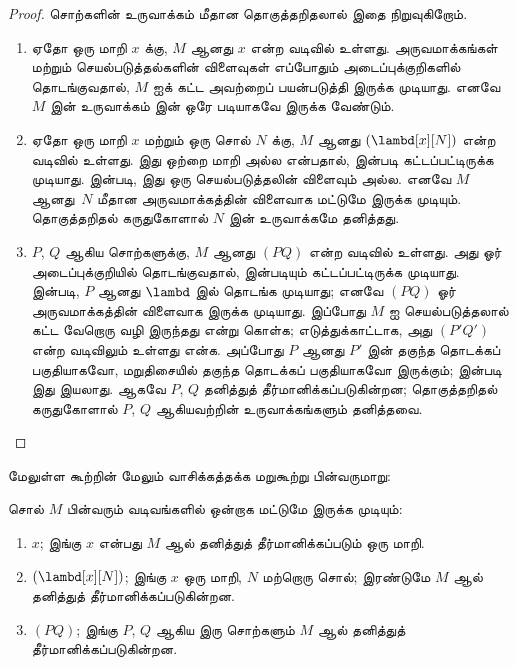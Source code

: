 \documentclass[../../../include/open-logic-section]{subfiles}
\begin{document}
\begin{proof}
  சொற்களின் உருவாக்கம் மீதான தொகுத்தறிதலால் இதை நிறுவுகிறோம்.
  \begin{enumerate}
    \item ஏதோ ஒரு மாறி $x$ க்கு, $M$ ஆனது $x$ என்ற வடிவில் உள்ளது.
      அருவமாக்கங்கள் மற்றும் செயல்படுத்தல்களின் விளைவுகள் எப்போதும்
      அடைப்புக்குறிகளில் தொடங்குவதால், $M$ ஐக் கட்ட அவற்றைப் பயன்படுத்தி
      இருக்க முடியாது. எனவே $M$ இன் உருவாக்கம்
       இன் ஒரே படியாகவே
      இருக்க வேண்டும்.
    \item ஏதோ ஒரு மாறி $x$ மற்றும் ஒரு சொல் $N$ க்கு, $M$ ஆனது
      $(\lambd[x][N])$ என்ற வடிவில் உள்ளது. இது ஒற்றை மாறி அல்ல என்பதால்,
       இன்படி கட்டப்பட்டிருக்க
      முடியாது.  இன்படி, இது ஒரு செயல்படுத்தலின்
      விளைவும் அல்ல. எனவே $M$ ஆனது~$N$ மீதான அருவமாக்கத்தின் விளைவாக மட்டுமே
      இருக்க முடியும். தொகுத்தறிதல் கருதுகோளால் $N$ இன் உருவாக்கமே தனித்தது.
    \item $P$, $Q$ ஆகிய சொற்களுக்கு, $M$ ஆனது $(PQ)$ என்ற வடிவில் உள்ளது.
      அது ஓர் அடைப்புக்குறியில் தொடங்குவதால்,
       இன்படியும் கட்டப்பட்டிருக்க
      முடியாது.  இன்படி, $P$ ஆனது $\lambd$ இல்
      தொடங்க முடியாது; எனவே $(PQ)$ ஓர் அருவமாக்கத்தின் விளைவாக இருக்க முடியாது.
      இப்போது $M$ ஐ செயல்படுத்தலால் கட்ட வேறொரு வழி இருந்தது என்று கொள்க;
      எடுத்துக்காட்டாக, அது $(P'Q')$ என்ற வடிவிலும் உள்ளது என்க. அப்போது $P$
      ஆனது $P'$ இன் தகுந்த தொடக்கப் பகுதியாகவோ, மறுதிசையில் தகுந்த தொடக்கப்
      பகுதியாகவோ இருக்கும்;  இன்படி இது
      இயலாது. ஆகவே $P$, $Q$ தனித்துத் தீர்மானிக்கப்படுகின்றன; தொகுத்தறிதல்
      கருதுகோளால் $P$, $Q$ ஆகியவற்றின் உருவாக்கங்களும் தனித்தவை.
  \end{enumerate}
\end{proof}

மேலுள்ள கூற்றின் மேலும் வாசிக்கத்தக்க மறுகூற்று பின்வருமாறு:
\begin{prop}
  சொல் $M$ பின்வரும் வடிவங்களில் ஒன்றாக மட்டுமே இருக்க முடியும்:
  \begin{enumerate}
    \item $x$; இங்கு $x$ என்பது $M$ ஆல் தனித்துத் தீர்மானிக்கப்படும் ஒரு மாறி.
    \item $(\lambd[x][N])$; இங்கு $x$ ஒரு மாறி, $N$ மற்றொரு சொல்; இரண்டுமே
      $M$ ஆல் தனித்துத் தீர்மானிக்கப்படுகின்றன.
    \item $(PQ)$; இங்கு $P$, $Q$ ஆகிய இரு சொற்களும் $M$ ஆல் தனித்துத்
      தீர்மானிக்கப்படுகின்றன.
  \end{enumerate}
\end{prop}
\end{document}

